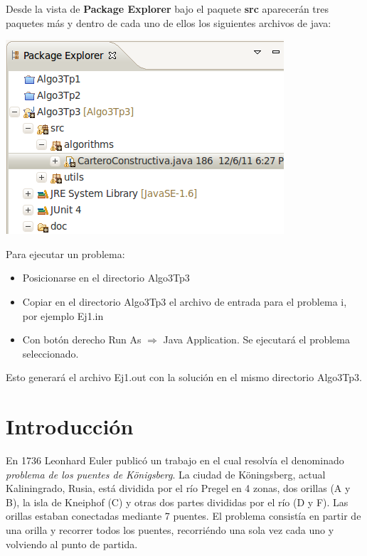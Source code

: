 \documentclass[11pt, a4paper, spanish]{article}
\begin{document}
	Desde la vista de \textbf{Package Explorer} bajo el paquete \textbf{src} aparecer\'an tres paquetes m\'as y dentro de cada uno de ellos los siguientes archivos de java:\\

	\begin{center}
		\includegraphics[scale=0.65]{others/packageExplorer.png}
	\end{center}

\newpage

	Para ejecutar un problema:

	\begin{itemize}
			\item{Posicionarse en el directorio Algo3Tp3}
			\item{Copiar en el directorio Algo3Tp3 el archivo de entrada para el problema i, por ejemplo Ej1.in}
			\item{Con bot\'on derecho Run As $\Rightarrow$ Java Application. Se ejecutar\'a el problema seleccionado.}
	\end{itemize}
	Esto generar\'a el archivo Ej1.out con la soluci\'on en el mismo directorio Algo3Tp3.

\newpage


\section{Introducci\'on}

	En 1736 Leonhard Euler public\'o un trabajo en el cual resolv\'ia el denominado \emph{problema de los puentes de K\"{o}nigsberg}. La ciudad de K\"{o}ningsberg, actual Kaliningrado, Rusia, est\'a dividida por el r\'io Pregel en 4 zonas, dos orillas (A y B), la isla de Kneiphof (C) y otras dos partes divididas por el r\'io (D y F). Las orillas estaban conectadas mediante 7 puentes. El problema consist\'ia en partir de una orilla y recorrer todos los puentes, recorri\'endo una sola vez cada uno y volviendo al punto de partida.\\
\end{document}
